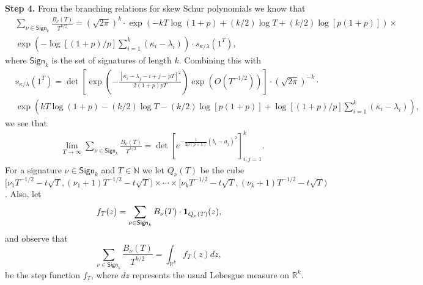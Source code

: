 \textbf{Step 4.}
From the branching relations for skew Schur polynomials we know that 
\begin{equation}\label{Q2}
\begin{split}
&\sum_{\nu \in \mathsf{Sign}_k} \frac{ B_\nu(T)}{T^{k/2}} = (\sqrt{2\pi})^{k}  \cdot \exp \left( - k T \log (1+p)  + (k/2) \log T + (k/2) \log [p(1+p)]  \right) \times \\
& \exp \left( -\log [(1+p) /p] \sum_{i = 1}^k (\kappa_i - \lambda_i)  \right) \cdot s_{\kappa / \lambda} (1^T) ,
\end{split}
\end{equation}
where $\mathsf{Sign}_k$ is the set of signatures of length $k$. Combining this with 
\begin{equation}\label{R3}
\begin{split}
&s_{\kappa / \lambda} (1^T) = \det \left[ \exp \left( - \frac{[\kappa_i - \lambda_j - i + j - p T]^2}{2(1+p)pT} \right)   \exp \left( O(T^{-1/2}) \right) \right] \cdot  (\sqrt{2\pi})^{-k}  \cdot\\
&\exp \left( k T \log (1+p)  -(k/2) \log T - (k/2) \log [p(1+p)] + \log [(1+p) /p] \sum_{i = 1}^k (\kappa_i - \lambda_i)  \right),
\end{split}
\end{equation}
we see that
\begin{equation}\label{Q3}
\begin{split}
&\lim_{T \rightarrow \infty} \sum_{\nu \in \mathsf{Sign}_k} \frac{ B_\nu(T)}{T^{k/2}} = \det\left[e^{-\frac{1}{2p(p+1)}(b_{i}-a_{j})^{2}}\right]_{i,j=1}^{k}.
\end{split}
\end{equation}
For a signature $\nu \in \mathsf{Sign}_k$ and $T \in \mathbb{N}$ we let $Q_\nu(T)$  be the cube $[\nu_1T^{-1/2} - t \sqrt{T}, (\nu_1 + 1) T^{-1/2}- t \sqrt{T} )\times \cdots \times [\nu_kT^{-1/2} - t \sqrt{T}, (\nu_k + 1) T^{-1/2} - t \sqrt{T} )$. Also, let 
\begin{equation}\label{Q4}
f_T(z) = \sum_{\nu \in \mathsf{Sign}_k} B_{\nu}(T) \cdot {\bf 1}_{ Q_\nu(T) }(z),
\end{equation}
and observe that 
\begin{equation}\label{Q5}
\sum_{\nu \in \mathsf{Sign}_k} \frac{ B_\nu(T)}{T^{k/2}}  = \int_{\mathbb{R}^k} f_T(z) dz,
\end{equation}
be the step function $f_T$, where $dz$ represents the usual Lebesgue measure on $\mathbb{R}^k$.


